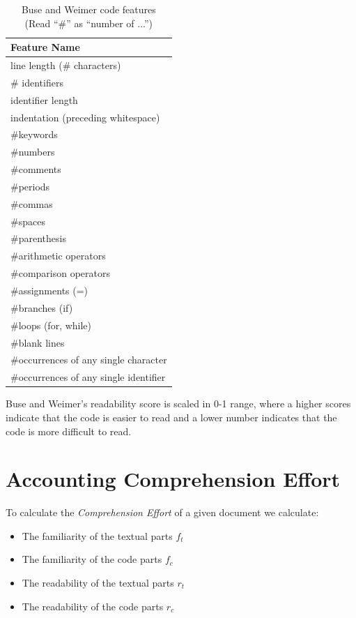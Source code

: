 \documentclass[12pt,mscthesis]{usiinfthesis}
\begin{document}
	\begin {table}[H]
	\begin{center}
    \begin{tabular}{ | l | }
    \hline
    \textbf{Feature Name}\\ \hline
	line length (\# characters)\\ \hline
 	\# identifiers\\ \hline
 	identifier length\\ \hline
	indentation (preceding whitespace)\\ \hline
	\#keywords\\ \hline
	 \#numbers\\ \hline
	\#comments\\ \hline
	\#periods\\ \hline
	\#commas\\ \hline
	\#spaces\\ \hline
	\#parenthesis\\ \hline
	 \#arithmetic operators\\ \hline
	 \#comparison operators\\ \hline
	 \#assignments (=)\\ \hline
	 \#branches (if)\\ \hline
	 \#loops (for, while)\\ \hline
	 \#blank lines\\ \hline
	 \#occurrences of any single character\\ \hline
	 \#occurrences of any single identifier\\ \hline
    \end{tabular}
	\end{center}
		\caption{Buse and Weimer code features \\ (Read “\#” as “number of ...”)} \label{tab:Buse and Weimer} 
	\end{table}

	Buse and Weimer's readability score is scaled in 0-1 range, where a higher scores indicate that the code is easier to read and a lower number indicates that the code is more difficult to read.


\section{Accounting Comprehension Effort }

To calculate the \emph{Comprehension Effort} of a given document we calculate:
\begin{itemize}
\item The familiarity of the textual parts $f_{t}$ 
\item The familiarity of the code parts $f_{c}$
\item The readability of the textual parts $r_{t}$
\item The readability of the code parts $r_{c}$ 
\end{itemize}
 
\end{document}

